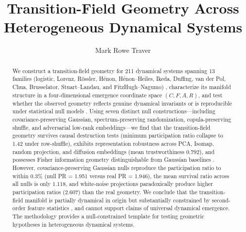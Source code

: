 \documentclass[aip,chaos,showpacs,superscriptaddress,groupedaddress]{revtex4-1}
\begin{document}
\title{Transition-Field Geometry Across Heterogeneous Dynamical Systems}

\author{Mark Rowe Traver}

\begin{abstract}
We construct a transition-field geometry for 211 dynamical systems spanning 13 families (logistic, Lorenz, R\"ossler, H\'enon, H\'enon--Heiles, Ikeda, Duffing, van der Pol, Chua, Brusselator, Stuart--Landau, and FitzHugh--Nagumo) \cite{lorenz1963deterministic, rossler1976equation, henon1976two-dimensional, ikeda1979multiple, duffing1918zwang, vanderpol1927forced, chua1986simple, prigogine1968dissipative, stuart1960forced, fitzhugh1961impulses, nagumo1962active}, characterize its manifold structure in a four-dimensional emergence coordinate space $(C, F, A, R)$, and test whether the observed geometry reflects genuine dynamical invariants or is reproducible under statistical null models \cite{amari2016information, villani2009optimal, peyre2019optimal}. Using seven distinct null constructions---including covariance-preserving Gaussian, spectrum-preserving randomization, copula-preserving shuffle, and adversarial low-rank embeddings---we find that the transition-field geometry survives causal destruction tests (minimum participation ratio collapse to 1.42 under row-shuffle), exhibits representation robustness across PCA, Isomap, random projection, and diffusion embeddings \cite{tenenbaum2000global, roweis2000nonlinear, belkin2003laplacian, mcinnes2018umap, coifman2005geometric} (mean trustworthiness 0.792), and possesses Fisher information geometry \cite{amari1982differential} distinguishable from Gaussian baselines \cite{cover1991elements}. However, covariance-preserving Gaussian nulls reproduce the participation ratio to within 0.3\% (null PR = 1.951 versus real PR = 1.946), the mean survival ratio across all nulls is only 1.118, and white-noise projections paradoxically produce higher participation ratios (2.607) than the real geometry. We conclude that the transition-field manifold is partially dynamical in origin but substantially constrained by second-order feature statistics \cite{donoho2000intrinsic, verleysen2005curse}, and cannot support claims of universal dynamical emergence. The methodology provides a null-constrained template for testing geometric hypotheses in heterogeneous dynamical systems.
\end{abstract}

\end{document}
